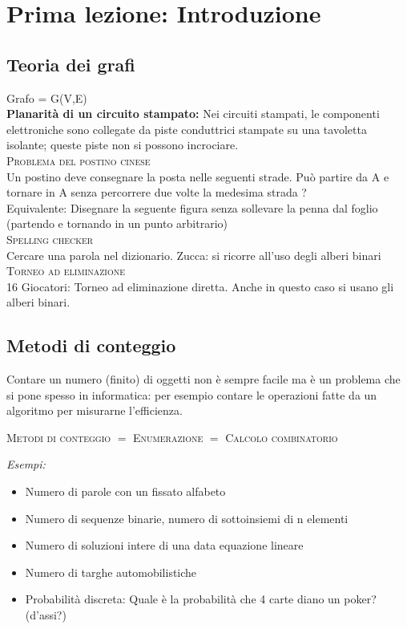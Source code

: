 
    \section{Prima lezione: Introduzione}

    \subsection{Teoria dei grafi}
        Grafo = G(V,E) \\
        \textbf{Planarità di un circuito stampato:} 
Nei circuiti stampati, le componenti elettroniche sono collegate da piste conduttrici stampate su una tavoletta
isolante; queste piste non si possono incrociare.\\

\textsc{Problema del postino cinese} \\
Un postino deve consegnare la posta nelle seguenti strade. Può partire da A e tornare in A senza percorrere due volte
la medesima strada ? \\
Equivalente: Disegnare la seguente figura senza sollevare la penna dal foglio (partendo e tornando in un punto
arbitrario) \\

\textsc{Spelling checker} \\
Cercare una parola nel dizionario. Zucca: si ricorre all'uso degli alberi binari \\

\textsc{Torneo ad eliminazione} \\
16 Giocatori: Torneo ad eliminazione diretta. Anche in questo caso si usano gli alberi binari.

\subsection{Metodi di conteggio} 
Contare un numero (finito) di oggetti non è sempre facile ma è un problema che si pone spesso in
informatica: per esempio contare le operazioni fatte da un algoritmo per misurarne l'efficienza. \\
\begin{center}
\textsc{Metodi di conteggio $=$ Enumerazione $=$ Calcolo combinatorio}
\end{center} 

\textit{Esempi:} 
\begin{itemize}
        \item Numero di parole con un fissato alfabeto
\item Numero di sequenze binarie, numero di sottoinsiemi di n elementi
\item Numero di soluzioni intere di una data equazione lineare
\item Numero di targhe automobilistiche
\item Probabilità discreta: Quale è la probabilità che 4 carte diano un poker? (d'assi?)
\end{itemize}

